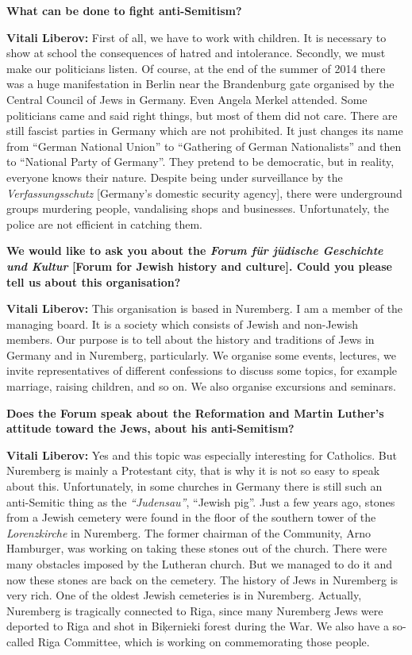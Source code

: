 \textbf{What can be done to fight anti-Semitism?} 

\textbf{Vitali Liberov:} First of all, we have to work with children. It is necessary to show at school the consequences of hatred and intolerance. Secondly, we must make our politicians listen. Of course, at the end of the summer of 2014 there was a huge manifestation in Berlin near the Brandenburg gate organised by the Central Council of Jews in Germany. Even Angela Merkel attended. Some politicians came and said right things, but most of them did not care. There are still fascist parties in Germany which are not prohibited. It just changes its name from ``German National Union'' to ``Gathering of German Nationalists'' and then to ``National Party of Germany''. They pretend to be democratic, but in reality, everyone knows their nature. Despite being under surveillance by the \textit{Verfassungsschutz} [Germany's domestic security agency], there were underground groups murdering people, vandalising shops and businesses. Unfortunately, the police are not efficient in catching them. 

\textbf{We would like to ask you about the \textit{Forum für jüdische Geschichte und Kultur} [Forum for Jewish history and culture]. Could you please tell us about this organisation?}  

\textbf{Vitali Liberov:} This organisation is based in Nuremberg. I am a member of the managing board. It is a society which consists of Jewish and non-Jewish members. Our purpose is to tell about the history and traditions of Jews in Germany and in Nuremberg, particularly. We organise some events, lectures, we invite representatives of different confessions to discuss some topics, for example marriage, raising children, and so on. We also organise excursions and seminars. 

\textbf{Does the Forum speak about the Reformation and Martin Luther’s attitude toward the Jews, about his anti-Semitism?} 

\textbf{Vitali Liberov:} Yes and this topic was especially interesting for Catholics. But Nuremberg is mainly a Protestant city, that is why it is not so easy to speak about this. Unfortunately, in some churches in Germany there is still such an anti-Semitic thing as the \textit{``Judensau''}, ``Jewish pig''. Just a few years ago, stones from a Jewish cemetery were found in the floor of the southern tower of the \textit{Lorenzkirche} in Nuremberg. The former chairman of the Community, Arno Hamburger, was working on taking these stones out of the church. There were many obstacles imposed by the Lutheran church. But we managed to do it and now these stones are back on the cemetery. The history of Jews in Nuremberg is very rich. One of the oldest Jewish cemeteries is in Nuremberg. Actually, Nuremberg is tragically connected to Riga, since many Nuremberg Jews were deported to Riga and shot in Biķernieki forest during the War. We also have a so-called Riga Committee, which is working on commemorating those people.
